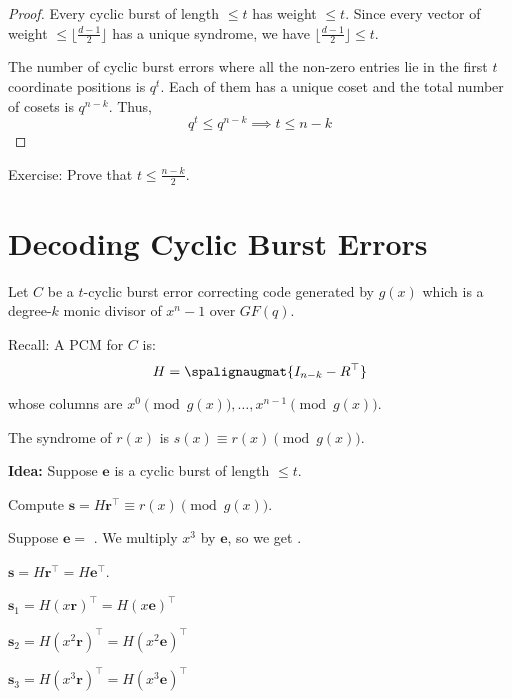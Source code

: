 \begin{proof}
    Every cyclic burst of length $ \leqslant t $ has weight $ \leqslant t $.
    Since every vector of weight $ \leqslant \lfloor \frac{d-1}{2} \rfloor $
    has a unique syndrome, we have $ \lfloor \frac{d-1}{2} \rfloor \leqslant t $.

    The number of cyclic burst errors where all the non-zero entries lie in the first
    $ t $ coordinate positions is $ q^t $. Each of them has a unique coset
    and the total number of cosets is $ q^{n-k} $. Thus,
    \[ q^t\leqslant q^{n-k}\implies t\leqslant n-k \]
\end{proof}

Exercise: Prove that $ t\leqslant \frac{n-k}{2} $.

\section{Decoding Cyclic Burst Errors}
Let $ C $ be a $ t $-cyclic burst error correcting code generated
by $ g(x) $ which is a degree-$ k $ monic divisor of $ x^n-1 $ over $ GF(q) $.

Recall: A PCM for $ C $ is:
\[ H= \spalignaugmat{I_{n-k} -R^\top} \]

whose columns are $ x^0 \pmod{g(x)},\ldots ,x^{n-1} \pmod{g(x)} $.

The syndrome of $ r(x) $ is $ s(x)\equiv r(x)\pmod{g(x)} $.

\textbf{Idea:} Suppose $ \bm{e} $ is a cyclic burst of length $ \leqslant t $.

Compute $ \bm{s}=H\bm{r}^\top\equiv r(x)\pmod{g(x)} $.

Suppose $ \bm{e}= $ . We multiply $ x^3 $ by $ \bm{e} $,
so we get .

$ \bm{s}=H\bm{r}^\top=H\bm{e}^\top $.

$ \bm{s}_1=H(x\bm{r})^\top = H(x\bm{e})^\top $

$ \bm{s}_2=H(x^2\bm{r})^\top = H(x^2\bm{e})^\top $

$ \bm{s}_3=H(x^3\bm{r})^\top = H(x^3\bm{e})^\top $
